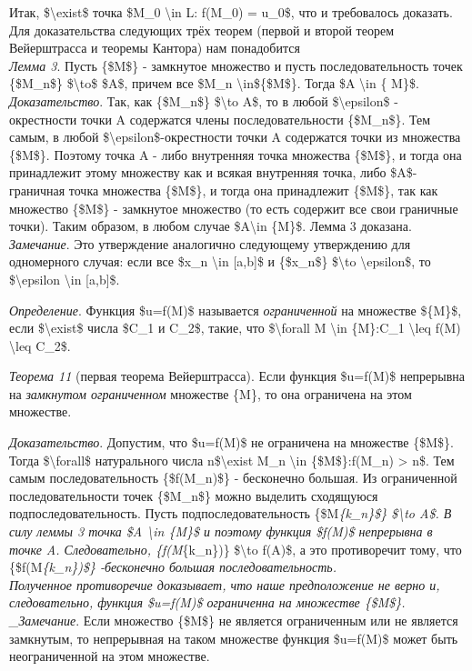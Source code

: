 \documentclass[
]{article}
\begin{document}
Итак, \$\textbackslash exist\$ точка \$M\_0 \textbackslash in L: f(M\_0)
= u\_0\$, что и требовалось доказать.\\
Для доказательства следующих трёх теорем (первой и второй теорем
Вейерштрасса и теоремы Кантора) нам понадобится\\
\emph{Лемма 3}. Пусть \{\$M\$\} - замкнутое множество и пусть
последовательность точек \{\$M\_n\$\} \$\textbackslash to\$ \$A\$,
причем все \$M\_n \textbackslash in\$\{\$M\$\}. Тогда \$A
\textbackslash in \{ M\}\$.\\
\emph{Доказательство}. Так, как \{\$M\_n\$\} \$\textbackslash to A\$, то
в любой \$\textbackslash epsilon\$ - окрестности точки A содержатся
члены последовательности \{\$M\_n\$\}. Тем самым, в любой
\$\textbackslash epsilon\$-окрестности точки A содержатся точки из
множества \{\$M\$\}. Поэтому точка A - либо внутренняя точка множества
\{\$M\$\}, и тогда она принадлежит этому множеству как и всякая
внутренняя точка, либо \$A\$- граничная точка множества \{\$M\$\}, и
тогда она принадлежит \{\$M\$\}, так как множество \{\$M\$\} - замкнутое
множество (то есть содержит все свои граничные точки). Таким образом, в
любом случае \$A\textbackslash in \{M\}\$. Лемма 3 доказана.\\
\emph{Замечание}. Это утверждение аналогично следующему утверждению для
одномерного случая: если все \$x\_n \textbackslash in {[}a,b{]}\$ и
\{\$x\_n\$\} \$\textbackslash to \textbackslash epsilon\$, то
\$\textbackslash epsilon \textbackslash in {[}a,b{]}\$.

\emph{Определение}. Функция \$u=f(M)\$ называется \emph{ограниченной} на
множестве \$\{M\}\$, если \$\textbackslash exist\$ числа \$C\_1 и
C\_2\$, такие, что \$\textbackslash forall M \textbackslash in
\{M\}:C\_1 \textbackslash leq f(M) \textbackslash leq C\_2\$.

\emph{Теорема 11} (первая теорема Вейерштрасса). Если функция \$u=f(M)\$
непрерывна на \emph{замкнутом ограниченном} множестве \{M\}, то она
ограничена на этом множестве.

\emph{Доказательство}. Допустим, что \$u=f(M)\$ не ограничена на
множестве \{\$M\$\}. Тогда \$\textbackslash forall\$ натурального числа
n\$\textbackslash exist M\_n \textbackslash in
\{\$M\$\}:\textbar f(M\_n)\textbar{} \textgreater{} n\$. Тем самым
последовательность \{\$f(M\_n)\$\} - бесконечно большая. Из ограниченной
последовательности точек \{\$M\_n\$\} можно выделить сходящуюся
подпоследовательность. Пусть подпоследовательность
\{\$M\emph{\{k\_n\}\$\} \$\textbackslash to A\$. В силу леммы 3 точка
\$A \textbackslash in \{M\}\$ и поэтому функция \$f(M)\$ непрерывна в
точке A. Следовательно, \{f(M}\{k\_n\})\} \$\textbackslash to f(A)\$, а
это противоречит тому, что \{\$f(M\emph{\{k\_n\})\$\} -бесконечно
большая последовательность.\\
Полученное противоречие доказывает, что наше предположение не верно и,
следовательно, функция \$u=f(M)\$ ограниченна на множестве \{\$M\$\}.\\
\_Замечание}. Если множество \{\$M\$\} не является ограниченным или не
является замкнутым, то непрерывная на таком множестве функция \$u=f(M)\$
может быть неограниченной на этом множестве.
\end{document}
